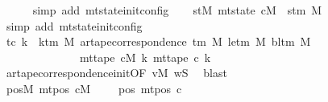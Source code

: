 \begin{isabellebody}
\ \ \ \ \isamarkupfalse%
\ {\isacharparenleft}{\kern0pt}simp\ add{\isacharcolon}{\kern0pt}\ mt{\isacharunderscore}{\kern0pt}state{\isacharunderscore}{\kern0pt}init{\isacharunderscore}{\kern0pt}config{\isacharparenright}{\kern0pt}\isanewline
\ \ \isamarkupfalse%
\ stM{\isacharcolon}{\kern0pt}\ {\isachardoublequoteopen}mt{\isacharunderscore}{\kern0pt}state\ {\isacharquery}{\kern0pt}cM\ {\isacharequal}{\kern0pt}\ s{\isacharunderscore}{\kern0pt}tm\ M{\isachardoublequoteclose}\ \isamarkupfalse%
\ {\isacharparenleft}{\kern0pt}simp\ add{\isacharcolon}{\kern0pt}\ mt{\isacharunderscore}{\kern0pt}state{\isacharunderscore}{\kern0pt}init{\isacharunderscore}{\kern0pt}config{\isacharparenright}{\kern0pt}\isanewline
\ \ \isamarkupfalse%
\ tc{\isacharcolon}{\kern0pt}\ {\isachardoublequoteopen}{\isasymforall}k\ {\isacharless}{\kern0pt}\ k{\isacharunderscore}{\kern0pt}tm\ M{\isachardot}{\kern0pt}\ ar{\isacharunderscore}{\kern0pt}tape{\isacharunderscore}{\kern0pt}correspondence\ {\isacharparenleft}{\kern0pt}{\isasymGamma}{\isacharunderscore}{\kern0pt}tm\ M{\isacharparenright}{\kern0pt}\ {\isacharparenleft}{\kern0pt}le{\isacharunderscore}{\kern0pt}tm\ M{\isacharparenright}{\kern0pt}\ {\isacharparenleft}{\kern0pt}bl{\isacharunderscore}{\kern0pt}tm\ M{\isacharparenright}{\kern0pt}\isanewline
\ \ \ \ \ \ \ \ \ \ \ \ \ \ {\isacharparenleft}{\kern0pt}mt{\isacharunderscore}{\kern0pt}tape\ {\isacharquery}{\kern0pt}cM\ k{\isacharparenright}{\kern0pt}\ {\isacharparenleft}{\kern0pt}mt{\isacharunderscore}{\kern0pt}tape\ {\isacharquery}{\kern0pt}c{\isacharprime}{\kern0pt}\ k{\isacharparenright}{\kern0pt}{\isachardoublequoteclose}\isanewline
\ \ \ \ \isamarkupfalse%
\ ar{\isacharunderscore}{\kern0pt}tape{\isacharunderscore}{\kern0pt}correspondence{\isacharunderscore}{\kern0pt}init{\isacharbrackleft}{\kern0pt}OF\ vM\ wS{\isacharbrackright}{\kern0pt}\ \isamarkupfalse%
\ blast\isanewline
\ \ \isamarkupfalse%
\ posM{\isacharcolon}{\kern0pt}\ {\isachardoublequoteopen}mt{\isacharunderscore}{\kern0pt}pos\ {\isacharquery}{\kern0pt}cM\ {\isacharequal}{\kern0pt}\ {\isacharparenleft}{\kern0pt}{\isasymlambda}{\isacharunderscore}{\kern0pt}{\isachardot}{\kern0pt}\ {}{\isacharparenright}{\kern0pt}{\isachardoublequoteclose}\ \ pos{\isacharprime}{\kern0pt}{\isacharcolon}{\kern0pt}\ {\isachardoublequoteopen}mt{\isacharunderscore}{\kern0pt}pos\ {\isacharquery}{\kern0pt}c{\isacharprime}{\kern0pt}\ {\isacharequal}{\kern0pt}\ {\isacharparenleft}{\kern0pt}{\isasymlambda}{\isacharunderscore}{\kern0pt}{\isachardot}{\kern0pt}\ {}{\isacharparenright}{\kern0pt}{\isachardoublequoteclose}\isanewline

\end{isabellebody}
